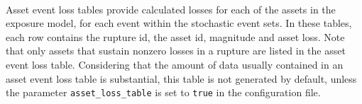 \inputminted[firstline=1,firstnumber=1,fontsize=\footnotesize,frame=single,bgcolor=lightgray]{xml}{oqum/risk/verbatim/output_event_loss_table_aggregate.csv}\\

Asset event loss tables provide calculated losses for each of the assets in
the exposure model, for each event within the stochastic event sets. In these
tables, each row contains the rupture id, the asset id, magnitude and asset
loss. Note that only assets that sustain nonzero losses in a rupture are
listed in the asset event loss table. Considering that the amount of data
usually contained in an asset event loss table is substantial, this table is
not generated by default, unless the parameter \Verb+asset_loss_table+ is set
to \Verb+true+ in the configuration file.
